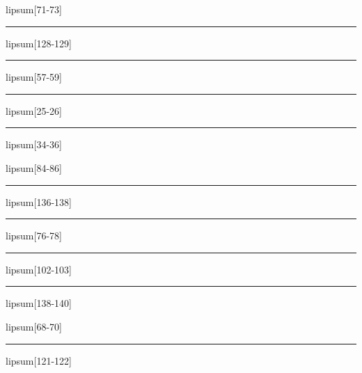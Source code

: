 \documentclass[11pt,a4paper]{article}
\begin{document}
lipsum[71-73]

\begin{simplewrap}
  \textcolor{red!46}{\rule{5.6cm}{8.2cm}}
\end{simplewrap}
lipsum[128-129]

\begin{simplewrap}
  \textcolor{violet!59}{\rule{5.4cm}{6.9cm}}
\end{simplewrap}
lipsum[57-59]

\begin{simplewrap}
  \textcolor{teal!53}{\rule{5.3cm}{8.1cm}}
\end{simplewrap}
lipsum[25-26]

\begin{simplewrap}
  \textcolor{blue!29}{\rule{5.4cm}{2.3cm}}
\end{simplewrap}
lipsum[34-36]

lipsum[84-86]

\begin{simplewrap}
  \textcolor{olive!21}{\rule{3.6cm}{8.3cm}}
\end{simplewrap}
lipsum[136-138]

\begin{simplewrap}
  \textcolor{teal!20}{\rule{3.8cm}{8.6cm}}
\end{simplewrap}
lipsum[76-78]

\begin{simplewrap}
  \textcolor{brown!17}{\rule{4.4cm}{2.6cm}}
\end{simplewrap}
lipsum[102-103]

\begin{simplewrap}
  \textcolor{magenta!33}{\rule{3.3cm}{5.2cm}}
\end{simplewrap}
lipsum[138-140]

lipsum[68-70]

\begin{simplewrap}
  \textcolor{pink!50}{\rule{5.8cm}{2.9cm}}
\end{simplewrap}
lipsum[121-122]
\end{document}
